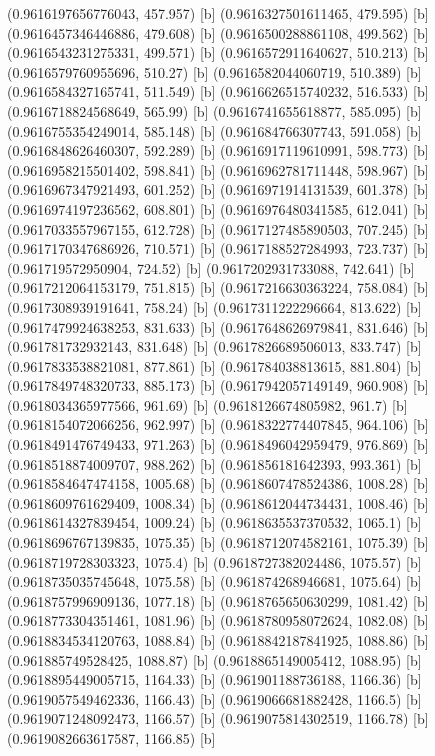 {{{(0.9616197656776043, 457.957) [b] 
(0.9616327501611465, 479.595) [b] 
(0.9616457346446886, 479.608) [b] 
(0.9616500288861108, 499.562) [b] 
(0.9616543231275331, 499.571) [b] 
(0.9616572911640627, 510.213) [b] 
(0.9616579760955696, 510.27) [b] 
(0.9616582044060719, 510.389) [b] 
(0.9616584327165741, 511.549) [b] 
(0.9616626515740232, 516.533) [b] 
(0.9616718824568649, 565.99) [b] 
(0.9616741655618877, 585.095) [b] 
(0.9616755354249014, 585.148) [b] 
(0.961684766307743, 591.058) [b] 
(0.9616848626460307, 592.289) [b] 
(0.9616917119610991, 598.773) [b] 
(0.9616958215501402, 598.841) [b] 
(0.9616962781711448, 598.967) [b] 
(0.9616967347921493, 601.252) [b] 
(0.9616971914131539, 601.378) [b] 
(0.9616974197236562, 608.801) [b] 
(0.9616976480341585, 612.041) [b] 
(0.9617033557967155, 612.728) [b] 
(0.9617127485890503, 707.245) [b] 
(0.9617170347686926, 710.571) [b] 
(0.9617188527284993, 723.737) [b] 
(0.961719572950904, 724.52) [b] 
(0.9617202931733088, 742.641) [b] 
(0.9617212064153179, 751.815) [b] 
(0.9617216630363224, 758.084) [b] 
(0.9617308939191641, 758.24) [b] 
(0.9617311222296664, 813.622) [b] 
(0.9617479924638253, 831.633) [b] 
(0.9617648626979841, 831.646) [b] 
(0.961781732932143, 831.648) [b] 
(0.9617826689506013, 833.747) [b] 
(0.9617833538821081, 877.861) [b] 
(0.961784038813615, 881.804) [b] 
(0.9617849748320733, 885.173) [b] 
(0.9617942057149149, 960.908) [b] 
(0.9618034365977566, 961.69) [b] 
(0.9618126674805982, 961.7) [b] 
(0.9618154072066256, 962.997) [b] 
(0.9618322774407845, 964.106) [b] 
(0.9618491476749433, 971.263) [b] 
(0.9618496042959479, 976.869) [b] 
(0.9618518874009707, 988.262) [b] 
(0.961856181642393, 993.361) [b] 
(0.9618584647474158, 1005.68) [b] 
(0.9618607478524386, 1008.28) [b] 
(0.9618609761629409, 1008.34) [b] 
(0.9618612044734431, 1008.46) [b] 
(0.9618614327839454, 1009.24) [b] 
(0.9618635537370532, 1065.1) [b] 
(0.9618696767139835, 1075.35) [b] 
(0.9618712074582161, 1075.39) [b] 
(0.9618719728303323, 1075.4) [b] 
(0.9618727382024486, 1075.57) [b] 
(0.9618735035745648, 1075.58) [b] 
(0.961874268946681, 1075.64) [b] 
(0.9618757996909136, 1077.18) [b] 
(0.9618765650630299, 1081.42) [b] 
(0.9618773304351461, 1081.96) [b] 
(0.9618780958072624, 1082.08) [b] 
(0.9618834534120763, 1088.84) [b] 
(0.9618842187841925, 1088.86) [b] 
(0.961885749528425, 1088.87) [b] 
(0.9618865149005412, 1088.95) [b] 
(0.9618895449005715, 1164.33) [b] 
(0.961901188736188, 1166.36) [b] 
(0.9619057549462336, 1166.43) [b] 
(0.9619066681882428, 1166.5) [b] 
(0.9619071248092473, 1166.57) [b] 
(0.9619075814302519, 1166.78) [b] 
(0.9619082663617587, 1166.85) [b] 
}}}
